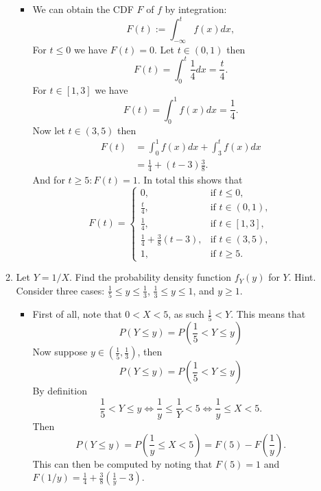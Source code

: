 \documentclass{article}
\begin{document}
\begin{enumerate}
\begin{enumerate}
				\begin{itemize}
					\item We can obtain the CDF $F$ of $f$ by integration:
					$$
					F(t) := \int_{-\infty}^t f(x) dx,
					$$
					For $t \leq 0$ we have $F(t) = 0$. Let $t \in (0, 1)$ then
					$$
					F(t) = \int_0^t \frac{1}{4} dx = \frac{t}{4}.
					$$
					For $t \in [1, 3]$ we have
					$$
					F(t) = \int_0^1 f(x) dx = \frac{1}{4}.
					$$
					Now let $t \in (3, 5)$ then
					$$
					\begin{aligned}
					F(t) &= \int_0^1 f(x) dx + \int_3^t f(x) dx \\
					&= \frac{1}{4} + (t - 3) \frac{3}{8}.
					\end{aligned}
					$$
					And for $t \geq 5 : F(t) = 1$. In total this shows that
					$$
					F(t) = 
					\begin{cases} 
					0, & \text{if } t \leq 0, \\
					\frac{t}{4}, & \text{if } t \in (0, 1), \\
					\frac{1}{4}, & \text{if } t \in [1, 3], \\
					\frac{1}{4} + \frac{3}{8}(t - 3), & \text{if } t \in (3, 5), \\
					1, & \text{if } t \geq 5.
					\end{cases}
					$$
				\end{itemize}
			\item Let $Y = 1 / X$. Find the probability density function $f_Y(y)$ for $Y$. Hint. Consider three cases: $\frac{1}{5} \leq y \leq \frac{1}{3}$, $\frac{1}{3} \leq y \leq 1$, and $y \geq 1$.
				\begin{itemize}
					\item First of all, note that $0 < X < 5$, as such $\frac{1}{5} < Y$. This means that
					$$
					P(Y \leq y) = P\left(\frac{1}{5} < Y \leq y \right)
					$$
					Now suppose $y \in \left(\frac{1}{5}, \frac{1}{3} \right)$, then
					$$
					P\left(Y \leq y\right) = P\left( \frac{1}{5} < Y \leq y \right)
					$$
					By definition
					$$
					\frac{1}{5} < Y \leq y \iff \frac{1}{y} \leq \frac{1}{Y} < 5 \iff \frac{1}{y} \leq X < 5.
					$$
					Then
					$$
					P\left(Y \leq y\right) = P\left(\frac{1}{y} \leq X < 5\right) = F(5) - F\left( \frac{1}{y} \right).
					$$
					This can then be computed by noting that $F(5) = 1$ and $F(1 / y) = \frac{1}{4} + \frac{3}{8}(\frac{1}{y} - 3)$.


\end{itemize}
\end{enumerate}
\end{enumerate}
\end{document}
